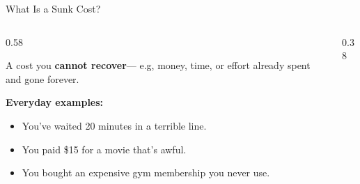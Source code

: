 \documentclass[9pt,english,aspectratio=169]{beamer}
\begin{document}
\begin{frame}{What Is a Sunk Cost?}

  \begin{columns}[T]
    \begin{column}{0.58\textwidth}
      \begin{definitionbox}
        A cost you \textbf{cannot recover}--- e.g, money, time, or effort already spent and gone forever.
      \end{definitionbox}

      \vspace{0.8em}
      \textbf{Everyday examples:}
      \begin{itemize}
        \item You've waited 20 minutes in a terrible line.
        \item You paid \$15 for a movie that's awful.
        \item You bought an expensive gym membership you never use.
      \end{itemize}
    \end{column}
    \begin{column}{0.38\textwidth}
    \end{column}
  \end{columns}

\end{frame}
\end{document}
